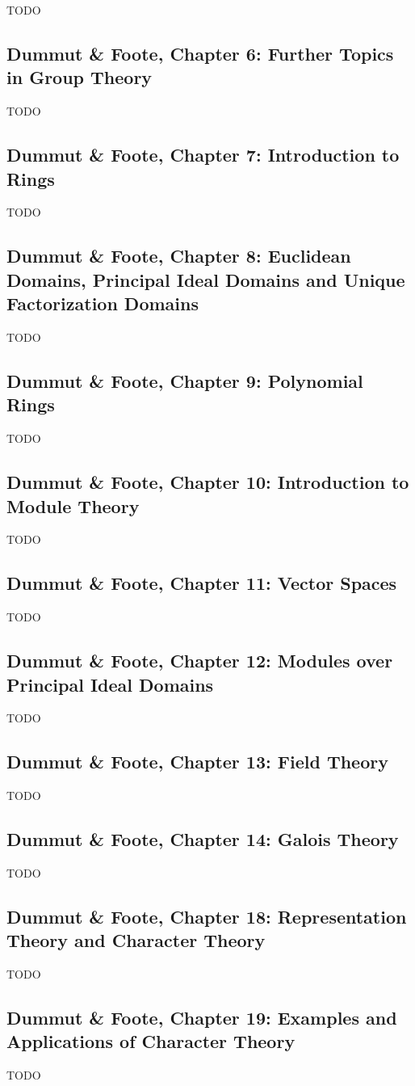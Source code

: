 TODO

\subsection{Dummut \& Foote, Chapter 6: Further Topics in Group Theory}

TODO

\subsection{Dummut \& Foote, Chapter 7: Introduction to Rings}

TODO

\subsection{Dummut \& Foote, Chapter 8: Euclidean Domains, Principal Ideal Domains and Unique Factorization Domains}

TODO

\subsection{Dummut \& Foote, Chapter 9: Polynomial Rings}

TODO

\subsection{Dummut \& Foote, Chapter 10: Introduction to Module Theory}

TODO

\subsection{Dummut \& Foote, Chapter 11: Vector Spaces}

TODO

\subsection{Dummut \& Foote, Chapter 12: Modules over Principal Ideal Domains}

TODO

\subsection{Dummut \& Foote, Chapter 13: Field Theory}

TODO

\subsection{Dummut \& Foote, Chapter 14: Galois Theory}

TODO

\subsection{Dummut \& Foote, Chapter 18: Representation Theory and Character Theory}

TODO

\subsection{Dummut \& Foote, Chapter 19: Examples and Applications of Character Theory}

TODO

